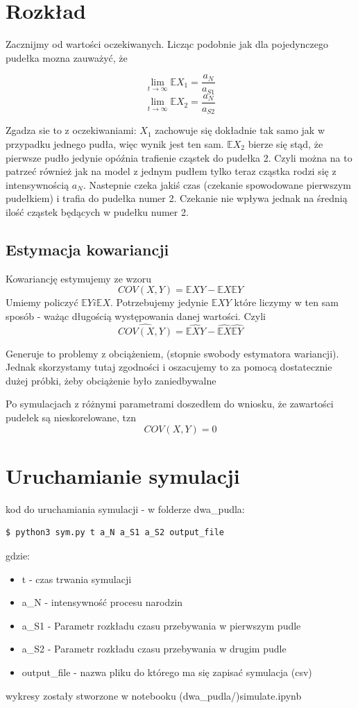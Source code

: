 \documentclass{article}
\begin{document}
\section{Rozkład}

Zacznijmy od wartości oczekiwanych. Licząc podobnie jak dla pojedynczego pudełka mozna zauważyć, że 

\[\lim_{t\rightarrow \infty}\mathbb{E}X_1 = \frac{a_N}{a_{S1}} \]
\[\lim_{t\rightarrow \infty}\mathbb{E}X_2 = \frac{a_N}{a_{S2}} \]

Zgadza sie to z oczekiwaniami:
$X_1$ zachowuje się dokładnie tak samo jak w przypadku jednego pudła, więc wynik jest ten sam. $\mathbb{E}X_2$ bierze się stąd, że pierwsze pudło jedynie opóźnia trafienie cząstek do pudełka 2. Czyli można na to patrzeć również jak na model z jednym pudłem tylko teraz cząstka rodzi się z intensywnością $a_N$. Nastepnie czeka jakiś czas (czekanie spowodowane pierwszym pudełkiem) i trafia do pudełka numer 2. Czekanie nie wpływa jednak na średnią ilość cząstek będących w pudełku numer 2.

\subsection{Estymacja kowariancji}

Kowariancję estymujemy ze wzoru \[COV(X,Y) = \mathbb{E}XY - \mathbb{E}X \mathbb{E}Y \] Umiemy policzyć $\mathbb{E}Y i \mathbb{E}X$. Potrzebujemy jedynie $\mathbb{E}XY$ które liczymy w ten sam sposób - ważąc długością występowania danej wartości. Czyli \[\hat{COV(X,Y)} = \hat{\mathbb{E}XY} - \hat{\mathbb{E}X} \hat{\mathbb{E}Y}\]

Generuje to problemy z obciążeniem, (stopnie swobody estymatora wariancji). Jednak skorzystamy tutaj zgodności i oszacujemy to za pomocą dostatecznie dużej próbki, żeby obciążenie było zaniedbywalne

Po symulacjach z różnymi parametrami doszedłem do wniosku, że zawartości pudełek są nieskorelowane, tzn \[COV(X,Y) = 0\]


\section{Uruchamianie symulacji}
\noindent kod do uruchamiania symulacji - w folderze dwa\_pudla:
\begin{lstlisting}[language=bash]
  $ python3 sym.py t a_N a_S1 a_S2 output_file 
\end{lstlisting}
gdzie: \begin{itemize}
\item t - czas trwania symulacji
\item a\_N - intensywność procesu narodzin
\item a\_S1 - Parametr rozkładu czasu przebywania w pierwszym pudle
\item a\_S2 - Parametr rozkładu czasu przebywania w drugim pudle
\item output\_file - nazwa pliku do którego ma się zapisać symulacja (csv)
\end{itemize}

wykresy zostały stworzone w notebooku (dwa\_pudla/)simulate.ipynb
\end{document}
